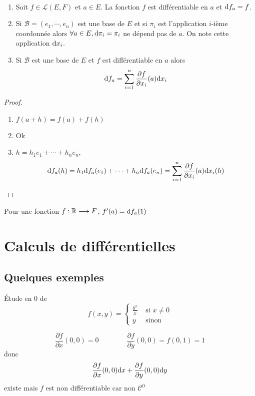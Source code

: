 \begin{thmdef}
    ~ \begin{enumerate}
        \item Soit $f\in\mathcal L(E, F)$ et $a\in E$. La fonction $f$ est différentiable en $a$ et $\mathrm{d} f_a=f$.
        \item Si $\mathcal B=(e_1, \cdots, e_n)$ est une base de $E$ et si $\pi_i$ est l'application $i$-ième coordonnée alors $\forall a\in E, \mathrm{d} \pi_i=\pi_i$ ne dépend pas de $a$. On note cette application $\mathrm{d} x_i$.
        \item Si $\mathcal B$ est une base de $E$ et $f$ est différentiable en $a$ alors \[
                \mathrm{d} f_a=\sum_{i=1}^n\frac{\partial f}{\partial x_i}(a)\mathrm{d} x_i
            \]
    \end{enumerate}
\end{thmdef}

\begin{proof} ~
    \begin{enumerate}
        \item $f(a+h)=f(a)+f(h)$
        \item Ok
        \item $h=h_1e_1+\cdots +h_ne_n$, \[
                \mathrm{d} f_a(h)=h_1\mathrm{d} f_a(e_1)+\cdots +h_n\mathrm{d} f_a(e_n)=\sum_{i=1}^n\frac{\partial f}{\partial x_i}(a)\mathrm{d} x_i(h)
            \]
    \end{enumerate}
\end{proof}

\begin{rem}
    Pour une fonction $f:\mathbb R\longrightarrow F$, $f'(a)=\mathrm{d} f_a(1)$
\end{rem}

\section{Calculs de différentielles}

\subsection{Quelques exemples}
\begin{ex} Étude en $0$ de
    \[
        f(x, y)=\begin{cases}
            \frac{y^2}x &\text{ si }x\neq 0\\ y & \text{ sinon}
        \end{cases}
    \]
\end{ex}

\[
    \frac{\partial f}{\partial x}(0, 0)=0 \qquad\qquad \frac{\partial f}{\partial y}(0, 0)=f(0, 1)=1
\]
donc \[
    \frac{\partial f}{\partial x}(0, 0) \mathrm{d} x+ \frac{\partial f}{\partial y}(0, 0)\mathrm{d} y
\]
existe mais $f$ est non différentiable car non $\mathcal C^0$

